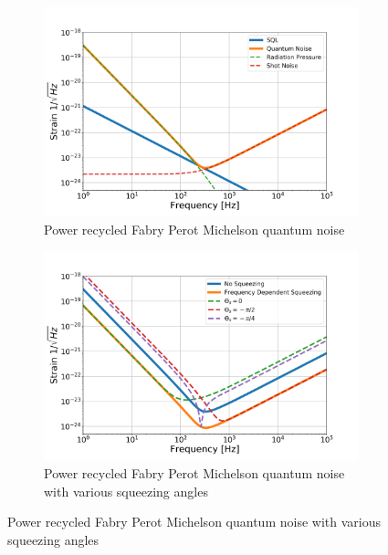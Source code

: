 	\begin{figure}[ht]
		\centering
		\begin{subfigure}[b]{0.7\textwidth}
			\centering
			\includegraphics[width=\textwidth]{../Figures/Kimble_PRFPMI_QM.png}
			\caption{Power recycled Fabry Perot Michelson quantum noise}
			\label{fig:kimble_PRFMI}
		\end{subfigure}
		\begin{subfigure}[b]{0.7\textwidth}
			\centering
			\includegraphics[width=\textwidth]{../Figures/Kimble_PRFPMI_QM_Sqz.png}
			\caption{Power recycled Fabry Perot Michelson quantum noise with various squeezing angles}
			\label{fig:kimble_PRFMI_sqz}
		\end{subfigure}
	\label{fig:PSD_PRFPMI}
	\end{figure}